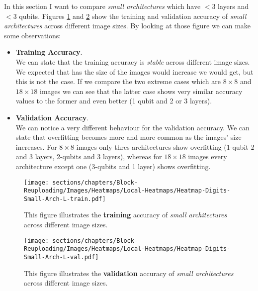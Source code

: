 In this section I want to compare \textit{small architectures} which have $< 3$ layers and $< 3$ qubits.
Figures \ref{fig:heatmap-Small-train} and \ref{fig:heatmap-Small-val} show the training and validation 
accuracy of \textit{small architectures} across different image sizes.
By looking at those figure we can make some observations:

\begin{itemize}
    \item \textbf{Training Accuracy}.\\
    We can state that the training accuracy is \textit{stable} across different image sizes.
    We expected that has the size of the images would increase we would get, but this is not the case.
    If we compare the two extreme cases which are $8\times8$ and $18\times18$ images we can see that 
    the latter case shows very similar accuracy values to the former and even better (1 qubit and 2 or 3 layers).
    
    \item \textbf{Validation Accuracy}.\\
    We can notice a very different behaviour for the validation accuracy.
    We can state that overfitting becomes more and more common as the images' size increases.
    For $8\times8$ images only thres architectures show overfitting (1-qubit 2 and 3 layers, 2-qubits 
    and 3 layers), whereas for $18\times18$ images every architecture except one (3-qubits and 1 layer) 
    shows overfitting.
\end{itemize}


\begin{figure}[H]
    \centering
    \texttt{[image: sections/chapters/Block-Reuploading/Images/Heatmaps/Local-Heatmaps/Heatmap-Digits-Small-Arch-L-train.pdf]}
    \caption{This figure illustrates the \textbf{training} accuracy of \textit{small architectures} across different image sizes.}
    \label{fig:heatmap-Small-train}
\end{figure}

\begin{figure}[H]
    \centering
    \texttt{[image: sections/chapters/Block-Reuploading/Images/Heatmaps/Local-Heatmaps/Heatmap-Digits-Small-Arch-L-val.pdf]}
    \caption{This figure illustrates the \textbf{validation} accuracy of \textit{small architectures} across different image sizes.}
    \label{fig:heatmap-Small-val}
\end{figure}